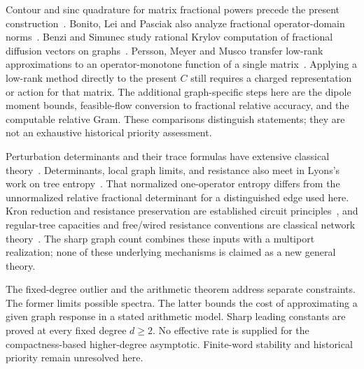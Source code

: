 Contour and sinc quadrature for matrix fractional powers precede the
present construction~\cite{HHT,BLP,TW}. Bonito, Lei and Pasciak also
analyze fractional operator-domain norms~\cite[Theorem 3.2]{BLP}.
Benzi and Simunec study rational Krylov computation of fractional
diffusion vectors on graphs~\cite{BS}. Persson, Meyer and Musco transfer
low-rank approximations to an operator-monotone function of a single
matrix~\cite{PMM}. Applying a low-rank method directly to the present
$C$ still requires a charged representation or action for that matrix.
The additional graph-specific steps here are the dipole moment bounds,
feasible-flow conversion to fractional relative accuracy, and the
computable relative Gram. These comparisons distinguish statements;
they are not an exhaustive historical priority assessment.

Perturbation determinants and their trace formulas have extensive
classical theory~\cite{GZ,Bornemann}. Determinants, local graph limits,
and resistance also meet in Lyons's work on tree entropy~\cite{LyonsEntropy}.
That normalized one-operator entropy differs from the unnormalized
relative fractional determinant for a distinguished edge used here.
Kron reduction and resistance preservation are established circuit
principles~\cite{DorflerBullo}, and regular-tree capacities and free/wired
resistance conventions are classical network theory~\cite{LyonsPeres}.
The sharp graph count combines these inputs with a multiport realization;
none of these underlying mechanisms is claimed as a new general theory.

The fixed-degree outlier and the arithmetic theorem address separate
constraints. The former limits possible spectra. The latter bounds
the cost of approximating a given graph response in a stated arithmetic
model. Sharp leading constants are proved at every fixed degree $d\ge2$.
No effective rate is supplied for the compactness-based higher-degree
asymptotic. Finite-word stability and historical priority remain
unresolved here.
